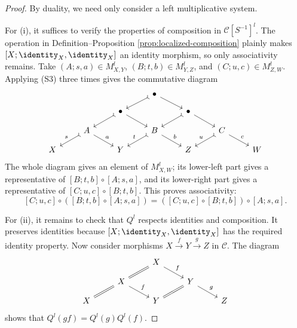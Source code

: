 \begin{proof}
	By duality, we need only consider a left multiplicative system.

	For (i), it suffices to verify the properties of composition in
	$\mathcal{C}[S^{-1}]^l$. The operation in Definition--Proposition
	\ref{prop:localized-composition} plainly makes
	$[X;\identity_X,\identity_X]$ an identity morphism, so only associativity
	remains. Take $(A;s,a)\in M_{X,Y}^l$, $(B;t,b)\in M_{Y,Z}^l$, and
	$(C;u,c)\in M_{Z,W}^l$. Applying (S3) three times gives the commutative
	diagram
	\[\begin{tikzcd}[row sep=small]
		& & & \bullet \arrow[rightarrowtail, ld] \arrow[rd] & & & \\
		& & \bullet \arrow[rightarrowtail, ld] \arrow[rd] & & \bullet \arrow[rightarrowtail, ld] \arrow[rd] & & \\
		& A \arrow[rightarrowtail, ld, "s"'] \arrow[rd, "a"] & & B \arrow[rightarrowtail, ld, "t"'] \arrow[rd, "b"] & & C \arrow[rightarrowtail, ld, "u"'] \arrow[rd, "c"] & \\
		X & & Y & & Z & & W
	\end{tikzcd}\]
	The whole diagram gives an element of $M_{X,W}^l$; its lower-left part
	gives a representative of $[B;t,b]\circ[A;s,a]$, and its lower-right part
	gives a representative of $[C;u,c]\circ[B;t,b]$. This proves
	associativity:
	\[ [C;u,c]\circ([B;t,b]\circ[A;s,a])=([C;u,c]\circ[B;t,b])\circ[A;s,a]. \]

	For (ii), it remains to check that $Q^l$ respects identities and composition.
	It preserves identities because $[X;\identity_X,\identity_X]$ has the
	required identity property. Now consider morphisms
	$X\xrightarrow{f}Y\xrightarrow{g}Z$ in
	$\mathcal{C}$. The diagram
	\[\begin{tikzcd}[row sep=small]
		& & X \arrow[equal, ld] \arrow[rd, "f"] & & \\
		& X \arrow[equal, ld] \arrow[rd, "f"] & & Y \arrow[equal, ld] \arrow[rd, "g"] & \\
		X & & Y & & Z
	\end{tikzcd}\]
	shows that $Q^l(gf)=Q^l(g)Q^l(f)$.
\end{proof}

